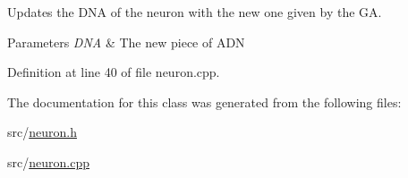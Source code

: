 Updates the D\-N\-A of the neuron with the new one given by the G\-A. 


\begin{DoxyParams}{Parameters}
{\em D\-N\-A} & The new piece of A\-D\-N \\
\hline
\end{DoxyParams}


Definition at line 40 of file neuron.\-cpp.



The documentation for this class was generated from the following files\-:\begin{DoxyCompactItemize}
\item 
src/\hyperlink{neuron_8h}{neuron.\-h}\item 
src/\hyperlink{neuron_8cpp}{neuron.\-cpp}\end{DoxyCompactItemize}
